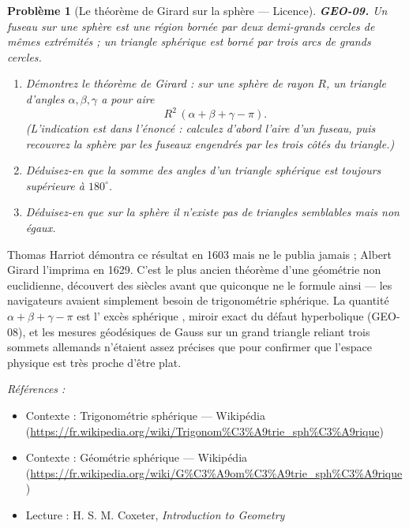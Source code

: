 \documentclass[11pt]{article}
\newtheorem{problem}{Problème}
\newenvironment{refs}{\par\small\noindent\emph{Références :}\begin{itemize}\setlength\itemsep{0pt}}{\end{itemize}\normalsize}
\begin{document}
\begin{problem}[{Le théorème de Girard sur la sphère --- Licence}]
\textbf{GEO-09.} Un fuseau sur une sphère est une région bornée par deux demi-grands cercles de
mêmes extrémités ; un triangle sphérique est borné par trois arcs de grands cercles.
\begin{enumerate}
\item[(a)] Démontrez le théorème de Girard : sur une sphère de rayon $ R $, un triangle d'angles
$ \alpha, \beta, \gamma $ a pour aire
\[ R^2\,(\alpha + \beta + \gamma - \pi). \]
(L'indication est dans l'énoncé : calculez d'abord l'aire d'un fuseau, puis recouvrez la sphère
par les fuseaux engendrés par les trois côtés du triangle.)
\item[(b)] Déduisez-en que la somme des angles d'un triangle sphérique est toujours supérieure à
$ 180^\circ $.
\item[(c)] Déduisez-en que sur la sphère il n'existe pas de triangles semblables mais non égaux.
\end{enumerate}

\end{problem}

\noindent Thomas Harriot démontra ce résultat en 1603 mais ne le publia jamais ; Albert
Girard l'imprima en 1629. C'est le plus ancien théorème d'une géométrie non euclidienne, découvert
des siècles avant que quiconque ne le formule ainsi --- les navigateurs avaient simplement besoin de
trigonométrie sphérique. La quantité $ \alpha + \beta + \gamma - \pi $ est l'\og{} excès sphérique \fg{},
miroir exact du défaut hyperbolique (GEO-08), et les mesures géodésiques de Gauss sur un grand
triangle reliant trois sommets allemands n'étaient assez précises que pour confirmer que l'espace
physique est très proche d'être plat.

\begin{refs}
\item Contexte : Trigonométrie sphérique --- Wikipédia (\url{https://fr.wikipedia.org/wiki/Trigonom%C3%A9trie_sph%C3%A9rique})
\item Contexte : Géométrie sphérique --- Wikipédia (\url{https://fr.wikipedia.org/wiki/G%C3%A9om%C3%A9trie_sph%C3%A9rique})
\item Lecture : H. S. M. Coxeter, \textit{Introduction to Geometry}
\end{refs}

\bigskip
\end{document}
